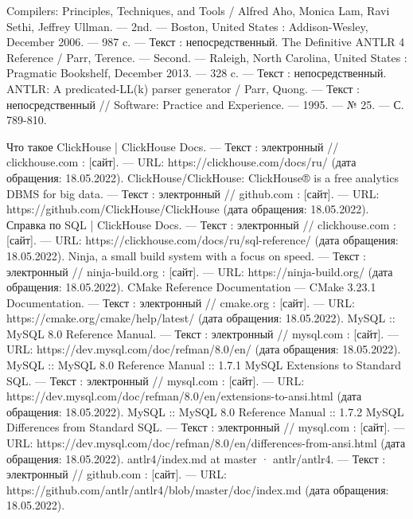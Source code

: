 \begin{thebibliography}{1}
 Compilers: Principles, Techniques, and Tools / Alfred Aho, Monica Lam, Ravi Sethi, Jeffrey Ullman. — 2nd. — Boston, United States : Addison-Wesley, December 2006. — 987 c. — Текст : непосредственный.
 The Definitive ANTLR 4 Reference / Parr, Terence. — Second. — Raleigh, North Carolina, United States : Pragmatic Bookshelf, December 2013. — 328 c. — Текст : непосредственный.
 ANTLR: A predicated-LL(k) parser generator / Parr, Quong. — Текст : непосредственный // Software: Practice and Experience. — 1995. — № 25. — С. 789-810.

 Что такое ClickHouse | ClickHouse Docs. — Текст : электронный // clickhouse.com : [сайт]. — URL: https://clickhouse.com/docs/ru/ (дата обращения: 18.05.2022).
 ClickHouse/ClickHouse: ClickHouse® is a free analytics DBMS for big data. — Текст : электронный // github.com : [сайт]. — URL: https://github.com/ClickHouse/ClickHouse (дата обращения: 18.05.2022).
 Справка по SQL | ClickHouse Docs. — Текст : электронный // clickhouse.com : [сайт]. — URL: https://clickhouse.com/docs/ru/sql-reference/ (дата обращения: 18.05.2022).
 Ninja, a small build system with a focus on speed. — Текст : электронный // ninja-build.org : [сайт]. — URL: https://ninja-build.org/ (дата обращения: 18.05.2022).
 CMake Reference Documentation — CMake 3.23.1 Documentation. — Текст : электронный // cmake.org : [сайт]. — URL: https://cmake.org/cmake/help/latest/ (дата обращения: 18.05.2022).
 MySQL :: MySQL 8.0 Reference Manual. — Текст : электронный // mysql.com : [сайт]. — URL: https://dev.mysql.com/doc/refman/8.0/en/ (дата обращения: 18.05.2022).
 MySQL :: MySQL 8.0 Reference Manual :: 1.7.1 MySQL Extensions to Standard SQL. — Текст : электронный // mysql.com : [сайт]. — URL: https://dev.mysql.com/doc/refman/8.0/en/extensions-to-ansi.html (дата обращения: 18.05.2022).
 MySQL :: MySQL 8.0 Reference Manual :: 1.7.2 MySQL Differences from Standard SQL. — Текст : электронный // mysql.com : [сайт]. — URL: https://dev.mysql.com/doc/refman/8.0/en/differences-from-ansi.html (дата обращения: 18.05.2022).
 antlr4/index.md at master · antlr/antlr4. — Текст : электронный // github.com : [сайт]. — URL: https://github.com/antlr/antlr4/blob/master/doc/index.md (дата обращения: 18.05.2022).

\end{thebibliography}
